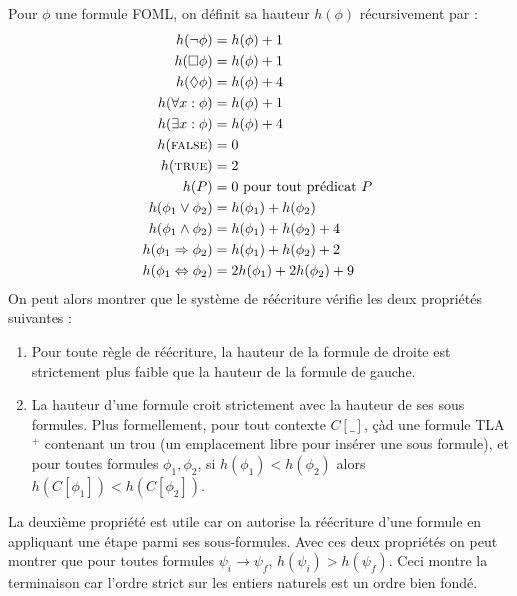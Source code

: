 \documentclass[12pt]{article}
\newcommand{\TRUE}{\textsc{true}}
\newcommand{\FALSE}{\textsc{false}}
\begin{document}
Pour $\phi$ une formule FOML, on définit sa hauteur \( h(\phi) \) récursivement par :
\begin{align*}
  h(\neg \phi) & = h(\phi) + 1 \\
  h(\Box \phi) & = h(\phi) + 1 \\
  h(\Diamond \phi) & = h(\phi) + 4 \\
  h(\forall x : \phi) & = h(\phi) + 1 \\
  h(\exists x : \phi) & = h(\phi) + 4 \\
  h(\FALSE) & = 0 \\
  h(\TRUE) & = 2 \\
  h(P) & = 0 \textup{ pour tout prédicat \(P\) } \\
  h(\phi_1 \lor \phi_2) & = h(\phi_1) + h(\phi_2) \\
  h(\phi_1 \land \phi_2) & = h(\phi_1) + h(\phi_2) + 4\\
  h(\phi_1 \Rightarrow \phi_2) & = h(\phi_1) + h(\phi_2) + 2\\
  h(\phi_1 \Leftrightarrow \phi_2) & = 2h(\phi_1) + 2h(\phi_2) + 9
\end{align*}
On peut alors montrer que le système de réécriture vérifie les deux propriétés suivantes :
\begin{enumerate}
\item Pour toute règle de réécriture, la hauteur de la formule de droite est strictement plus faible que la hauteur de la formule de gauche.
\item La hauteur d'une formule croit strictement avec la hauteur de ses sous formules.
  Plus formellement, pour tout contexte \( C[\_] \), çàd une formule TLA$^+$ contenant un \og{} trou \fg{} (un emplacement libre pour insérer une sous formule), et pour toutes formules \( \phi_1, \phi_2 \), si \( h(\phi_1) < h(\phi_2) \) alors \( h(C[\phi_1]) < h(C[\phi_2]) \).
\end{enumerate}

La deuxième propriété est utile car on autorise la réécriture d'une formule en appliquant une étape parmi ses sous-formules.
Avec ces deux propriétés on peut montrer que pour toutes formules \( \psi_i \longrightarrow \psi_f \), \( h(\psi_i) > h(\psi_f) \).
Ceci montre la terminaison car l'ordre strict sur les entiers naturels est un ordre bien fondé.
\end{document}

